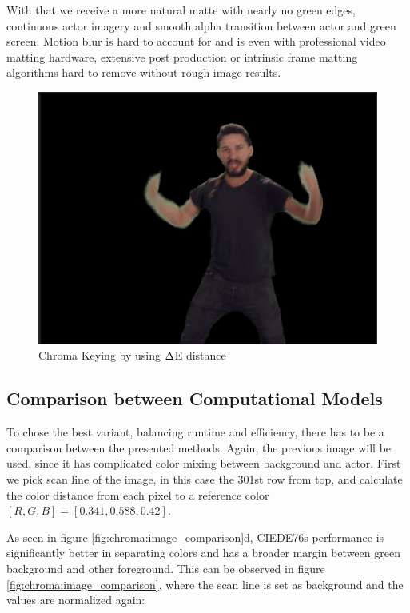 
With that we receive a more natural matte with nearly no green edges, 
continuous actor imagery and smooth alpha transition between actor and green 
screen. Motion blur is hard to account for and is even with professional video 
matting hardware, extensive post production or intrinsic frame matting 
algorithms hard to remove without rough image results.

\begin{figure}[htb]
	\includegraphics[width=\textwidth]{gfx/distances/chroma-deltae.png}
	\caption{Chroma Keying by using $\protect\Delta $E distance}
	\label{fig:chroma:deltae}
\end{figure}

\subsection{Comparison between Computational Models}

To chose the best variant, balancing runtime and efficiency, there has to be a 
comparison between the presented methods. Again, the previous image will be 
used, since it has complicated color mixing between background and actor. First 
we pick scan line of the image, in this case the 301st row from top, and 
calculate the color distance from each pixel to a reference color $[R, G, B] = 
[0.341, 0.588, 0.42]$.

As seen in figure \ref{fig:chroma:image_comparison}d, CIEDE76s performance is 
significantly better in separating colors and has a broader margin between 
green background and other foreground. This can be observed in figure 
\ref{fig:chroma:image_comparison}, where the scan line is set as background and 
the values are normalized again:

